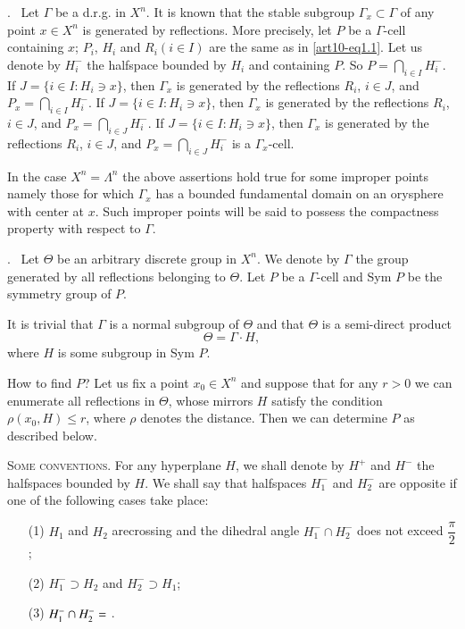 .~ Let $\Gamma$ be a d.r.g. in $X^n$. It is known that the stable subgroup $\Gamma_x \subset \Gamma$ of any point $x \in X^n$ is generated by reflections. More precisely, let $P$ be a $\Gamma$-cell containing $x$; $P_i$, $H_i$ and $R_i (i \in I)$  are the same as in \eqref{art10-eq1.1}. Let us denote by $H^-_i$ the halfspace bounded  by $H_i$ and containing $P$. So $P= \bigcap\limits_{i \in I} H^-_i$. If $J = \{i \in I : H_i \ni x\}$, then $\Gamma_x$ is generated by the reflections $R_i$, $i \in J$, and $P_x = \bigcap\limits_{i \in I} H^-_i$. If $J = \{i \in I: H_i \ni x\}$, then $\Gamma_x$ is generated by the reflections $R_i$, $i \in J$, and $P_x = \bigcap\limits_{i \in J} H^-_i$. If $J = \{i \in I: H_i \ni x\}$, then $\Gamma_x$ is generated by the reflections $R_i$, $i \in J$, and $P_x = \bigcap\limits_{i \in J}H^-_i$  is a $\Gamma_x$-cell.

In the case $X^n = \Lambda^n$ the above assertions hold true for some improper points namely those for which $\Gamma_x$ has a bounded fundamental domain on an orysphere with  center at $x$. Such improper points will be said to possess the compactness property with respect to $\Gamma$. 

.~ Let $\Theta$ be an arbitrary discrete group in $X^n$. We denote by $\Gamma$ the group generated by all reflections belonging to $\Theta$. Let $P$ be a $\Gamma$-cell and Sym $P$ be the symmetry group of $P$.

It is trivial that $\Gamma$ is a normal subgroup of $\Theta$ and that $\Theta$ is a semi-direct product 
\begin{equation}
\Theta = \Gamma \cdot H, \label{art10-eq1.1} 
\end{equation}
where $H$ is some subgroup in Sym $P$.

How to find $P$? Let us fix a point $x_0 \in X^n$ and suppose that for any $r >0$ we can enumerate all reflections in $\Theta$, whose mirrors $H$ satisfy the condition $\rho (x_0, H) \leqslant r$, where $\rho$ denotes the distance. Then we can determine $P$ as described below.

\medskip
\textsc{Some conventions.} For any hyperplane $H$, we shall denote by $H^+$ and $H^-$ the halfspaces bounded by $H$. We shall say that halfspaces $H^-_1$ and $H^-_2$ are opposite if one of the following cases take place:
\begin{itemize}
\item[(1)] $H_1$ and $H_2$ are\pageoriginale crossing and the dihedral angle $H^-_1 \cap H^-_2$ does not exceed $\dfrac{\pi}{2}$;

\item[(2)] $H^-_1 \supset H_2$ and $H^-_2 \supset H_1$;

\item[(3)] $H^-_1 \cap H^-_2 = \empty$ .
\end{itemize}

